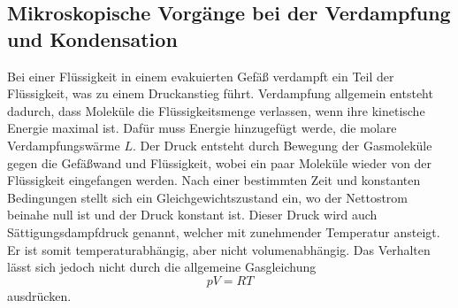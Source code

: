 \subsection{Mikroskopische Vorgänge bei der Verdampfung und Kondensation} %
\label{sub:Mikro_Vorgänge}
Bei einer Flüssigkeit in einem evakuierten Gefäß verdampft ein Teil der Flüssigkeit, was zu einem Druckanstieg führt.
Verdampfung allgemein entsteht dadurch, dass Moleküle die Flüssigkeitsmenge verlassen, wenn ihre kinetische Energie maximal ist.
Dafür muss Energie hinzugefügt werde, die molare Verdampfungswärme $L$.
Der Druck entsteht durch Bewegung der Gasmoleküle gegen die Gefäßwand und Flüssigkeit, wobei ein paar Moleküle wieder von der Flüssigkeit eingefangen werden.
Nach einer bestimmten Zeit und konstanten Bedingungen stellt sich ein Gleichgewichtszustand ein, wo der Nettostrom beinahe null ist und der Druck konstant ist.
Dieser Druck wird auch Sättigungsdampfdruck genannt, welcher mit zunehmender Temperatur ansteigt.
Er ist somit temperaturabhängig, aber nicht volumenabhängig.
Das Verhalten lässt sich jedoch nicht durch die allgemeine Gasgleichung
\begin{equation*}
    pV = RT
\end{equation*}
ausdrücken.

 

